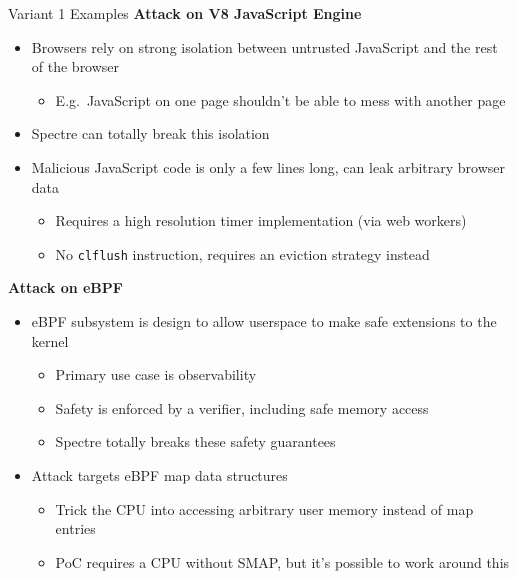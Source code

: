 \documentclass[10pt, dvipsnames, aspectratio=169]{beamer}
\begin{document}
\begin{frame}[c]{Variant 1 Examples}{}
  {\bf Attack on V8 JavaScript Engine}
  \begin{itemize}
    \item Browsers rely on strong isolation between untrusted JavaScript and the rest of the browser
    \begin{itemize}
      \item E.g.~JavaScript on one page shouldn't be able to mess with another page
    \end{itemize}
    \item Spectre can totally break this isolation
    \item Malicious JavaScript code is only a few lines long, can leak arbitrary browser data
    \begin{itemize}
      \item Requires a high resolution timer implementation (via web workers)
      \item No {\tt clflush} instruction, requires an eviction strategy instead
    \end{itemize}
  \end{itemize}

  \vfill
  {\bf Attack on eBPF}
  \begin{itemize}
    \item eBPF subsystem is design to allow userspace to make safe extensions to the kernel
    \begin{itemize}
      \item Primary use case is observability
      \item Safety is enforced by a verifier, including safe memory access
      \item Spectre totally breaks these safety guarantees
    \end{itemize}
    \item Attack targets eBPF map data structures
    \begin{itemize}
      \item Trick the CPU into accessing arbitrary user memory instead of map entries
      \item PoC requires a CPU without SMAP, but it's possible to work around this
    \end{itemize}
  \end{itemize}
\end{frame}
\end{document}
